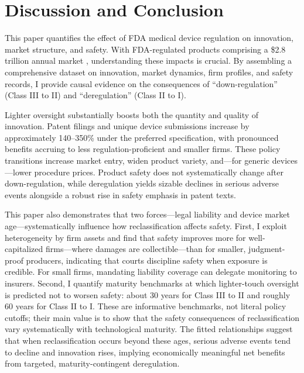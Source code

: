 \documentclass[letterpaper,12pt]{article}
\theoremstyle{definition}
\begin{document}


  
\section{Discussion and Conclusion}\label{sec:Conclusion}


This paper quantifies the effect of FDA medical device regulation on innovation, market structure, and safety. With FDA-regulated products comprising a \$2.8 trillion annual market \citep{FDAFactsheet2020}, understanding these impacts is crucial. By assembling a comprehensive dataset on innovation, market dynamics, firm profiles, and safety records, I provide causal evidence on the consequences of ``down-regulation'' (Class III to II) and ``deregulation'' (Class II to I).

Lighter oversight substantially boosts both the quantity and quality of innovation. Patent filings and unique device submissions increase by approximately 140--350\% under the preferred specification, with pronounced benefits accruing to less regulation-proficient and smaller firms. These policy transitions increase market entry, widen product variety, and---for generic devices---lower procedure prices. Product safety does not systematically change after down-regulation, while deregulation yields sizable declines in serious adverse events alongside a robust rise in safety emphasis in patent texts.

This paper also demonstrates that two forces---legal liability and device market age---systematically influence how reclassification affects safety. First, I exploit heterogeneity by firm assets and find that safety improves more for well-capitalized firms---where damages are collectible---than for smaller, judgment-proof producers, indicating that courts discipline safety when exposure is credible. For small firms, mandating liability coverage can delegate monitoring to insurers. Second, I quantify maturity benchmarks at which lighter-touch oversight is predicted not to worsen safety: about 30 years for Class III to II and roughly 60 years for Class II to I. These are informative benchmarks, not literal policy cutoffs; their main value is to show that the safety consequences of reclassification vary systematically with technological maturity. The fitted relationships suggest that when reclassification occurs beyond these ages, serious adverse events tend to decline and innovation rises, implying economically meaningful net benefits from targeted, maturity-contingent deregulation.
\end{document}

